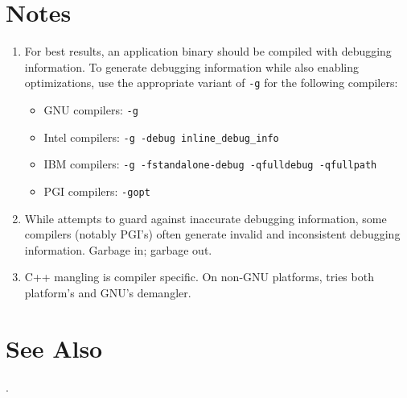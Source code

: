 \documentclass[english]{article}
\begin{document}
\section{Notes}

\begin{enumerate}

\item For best results, an application binary should be compiled with debugging information.
To generate debugging information while also enabling optimizations,
use the appropriate variant of \verb+-g+ for the following compilers:
\begin{itemize}
\item GNU compilers: \verb+-g+
\item Intel compilers: \verb+-g -debug inline_debug_info+
\item IBM compilers: \verb+-g -fstandalone-debug -qfulldebug -qfullpath+
\item PGI compilers: \verb+-gopt+
\end{itemize}

\item While  attempts to guard against inaccurate debugging information,
some compilers (notably PGI's) often generate invalid and inconsistent debugging information.
Garbage in; garbage out.

\item C++ mangling is compiler specific. On non-GNU platforms, 
tries both platform's and GNU's demangler.

\end{enumerate}




\section{See Also}

.
\end{document}

